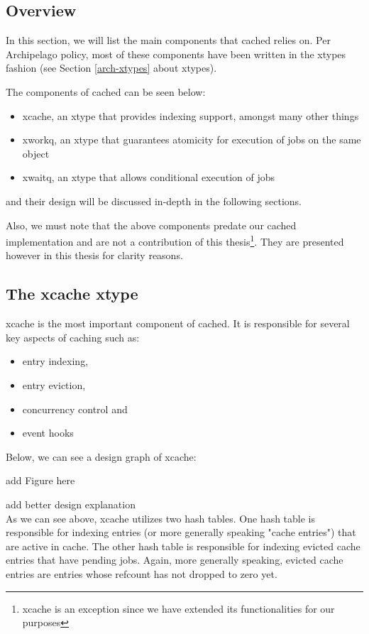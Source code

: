 \subsection{Overview}

In this section, we will list the main components that cached relies on. Per 
Archipelago policy, most of these components have been written in the xtypes 
fashion (see Section \ref{arch-xtypes} about xtypes).  

The components of cached can be seen below:
 
\begin{itemize}
	\item xcache, an xtype that provides indexing support, amongst many 
		other things
	\item xworkq, an xtype that guarantees atomicity for execution of jobs 
		on the same object
	\item xwaitq, an xtype that allows conditional execution of jobs
\end{itemize}

and their design will be discussed in-depth in the following sections.

Also, we must note that the above components predate our cached implementation 
and are not a contribution of this thesis\footnote{xcache is an exception since 
	we have extended its functionalities for our purposes}. They are 
presented however in this thesis for clarity reasons. 

\subsection{The xcache xtype}\label{sec:xcache-design}

xcache is the most important component of cached. It is responsible for several 
key aspects of caching such as:

\begin{itemize}
	\item entry indexing,
	\item entry eviction,
	\item concurrency control and
	\item event hooks
\end{itemize}

Below, we can see a design graph of xcache:

\fixme add Figure here

\fixme add better design explanation \\
As we can see above, xcache utilizes two hash tables. One hash table is 
responsible for indexing entries (or more generally speaking "cache entries") 
that are active in cache.  The other hash table is responsible for indexing 
evicted cache entries that have pending jobs.  Again, more generally speaking, 
evicted cache entries are entries whose refcount has not dropped to zero yet.

